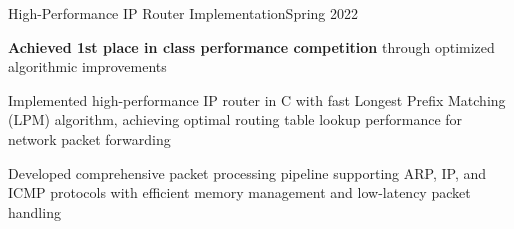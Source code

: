 \begin{joblong}{High-Performance IP Router Implementation}{Spring 2022}
	\item \textbf{Achieved 1st place in class performance competition} through optimized algorithmic improvements
	\item Implemented high-performance IP router in C with fast Longest Prefix Matching (LPM) algorithm, achieving optimal routing table lookup performance for network packet forwarding
	\item Developed comprehensive packet processing pipeline supporting ARP, IP, and ICMP protocols with efficient memory management and low-latency packet handling
\end{joblong}
